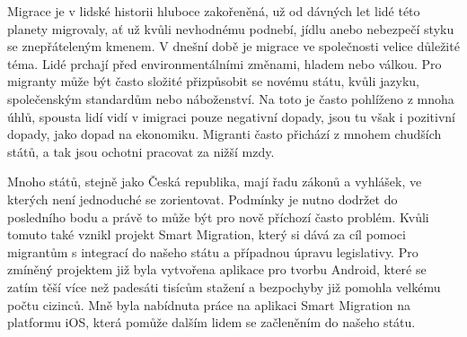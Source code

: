 %


\startthesis
\startbodymatter
Migrace je v lidské historii hluboce zakořeněná, už od dávných let lidé této planety migrovaly, ať už kvůli nevhodnému podnebí, jídlu anebo nebezpečí styku se znepřáteleným kmenem. V dnešní době je migrace ve společnosti velice důležité téma. Lidé prchají před environmentálními změnami, hladem nebo válkou. Pro migranty může být často složité přizpůsobit se novému státu, kvůli jazyku, společenským standardům nebo náboženství. Na toto je často pohlíženo z mnoha úhlů, spousta lidí vidí v imigraci pouze negativní dopady, jsou tu však i pozitivní dopady, jako dopad na ekonomiku. Migranti často přichází z mnohem chudších států, a tak jsou ochotni pracovat za nižší mzdy.

\par

Mnoho států, stejně jako Česká republika, mají řadu zákonů a vyhlášek, ve kterých není jednoduché se zorientovat. Podmínky je nutno dodržet do posledního bodu a právě to může být pro nově příchozí často problém. Kvůli tomuto také vznikl projekt Smart Migration, který si dává za cíl pomoci migrantům s integrací do našeho státu a případnou úpravu legislativy. Pro zmíněný projektem již byla vytvořena aplikace pro tvorbu Android, které se zatím těší více než padesáti tisícům stažení a bezpochyby již pomohla velkému počtu cizinců. Mně byla nabídnuta práce na aplikaci Smart Migration na platformu iOS, která pomůže dalším lidem se začleněním do našeho státu.

